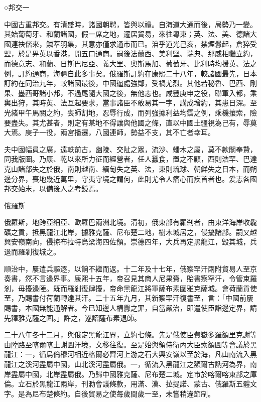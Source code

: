 
\begin{pinyinscope}
○邦交一

中國古重邦交。有清盛時，諸國朝聘，皆與以禮。自海道大通而後，局勢乃一變。其始葡萄牙、和蘭諸國，假一席之地，遷居貿易，來往粵東；英、法、美、德諸大國連袂偕來，鱗萃羽集，其意亦僅求通市而已。洎乎道光己亥，禁煙釁起，倉猝受盟，於是畀英以香港，開五口通商。嗣後法蘭西、美利堅、瑞典、那威相繼立約，而德意志、和蘭、日斯巴尼亞、義大里、奧斯馬加、葡萄牙、比利時均援英、法之例，訂約通商，海疆自此多事矣。俄羅斯訂約在康熙二十八年，較諸國最先，日本訂約在同治九年，較諸國最後，中國逼處強鄰，受禍尤烈。其他若秘魯、巴西、剛果、墨西哥諸小邦，不過尾隨大國之後，無他志也。咸豐庚申之役，聯軍入都，乘輿出狩，其時英、法互起要求，當事諸臣不敢易其一字，講成增約，其患日深。至光緒甲午馬關之約，喪師割地，忍辱行成，而列強據利益均霑之例，乘機攘索，險要盡失。其尤甚者，則定有某地不得讓與他國之條，直以中國土疆視為己有，辱莫大焉。庚子一役，兩宮播遷，八國連師，勢益不支，其不亡者幸耳。

夫中國幅員之廣，遠軼前古，幽陵、交阯之眾，流沙、蟠木之屬，莫不款關奉贄，同我版圖。乃康、乾以來所力征而經營者，任人蠶食，置之不顧，西則浩罕、巴達克山諸部失之於俄，南則越南、緬甸失之英、法，東則琉球、朝鮮失之日本，而朔邊分界，喪地幾近萬里，守夷守境之謂何，此則尤令人痛心而疾首者也。爰志各國邦交始末，以備後人之考鏡焉。

俄羅斯

俄羅斯，地跨亞細亞、歐羅巴兩洲北境。清初，俄東部有羅剎者，由東洋海岸收毳礦之貢，抵黑龍江北岸，據雅克薩、尼布楚二地，樹木城居之，侵擾諸部。嗣又越興安嶺南向，侵掠布拉特烏梁海四佐領。崇德四年，大兵再定黑龍江，毀其城，兵退而羅剎復城之。

順治中，屢遣兵驅逐，以餉不繼而返。十二年及十七年，俄察罕汗兩附貿易人至京奏書，然不言邊界事。康熙十五年，帝召見其商人尼果賚，貽書察罕汗，令管束羅剎，毋擾邊陲。既而羅剎復肆擾，帝命黑龍江將軍薩布素圍雅克薩城。會荷蘭貢使至，乃賜書付荷蘭轉達其汗。二十五年九月，其新察罕汗復書至，言：「中國前屢賜書，本國無能通解者。今已知邊人構釁之罪，自當嚴治，即遣使臣詣邊定界，請先釋雅克薩之圍。」許之，遂詔薩布素退師。

二十八年冬十二月，與俄定黑龍江界，立約七條。先是俄使臣費嶽多羅額里克謝等由陸路至喀爾喀土謝圖汗境，文移往復。至是始與領侍衛內大臣索額圖等會議於黑龍江：一，循烏倫穆河相近格爾必齊河上游之石大興安嶺以至於海，凡山南流入黑龍江之溪河盡屬中國，山北溪河盡屬俄。一，循流入黑龍江之額爾古訥河為界，南岸盡屬中國，北岸盡屬俄。乃歸中國雅克薩、尼布楚二城。定市於喀爾喀東部之庫倫。立石於黑龍江兩岸，刊泐會議條款，用滿、漢、拉提諾、蒙古、俄羅斯五體文字。是為尼布楚條約。自後貿易之使每歲間歲一至，未嘗稍違節制。


\end{pinyinscope}
